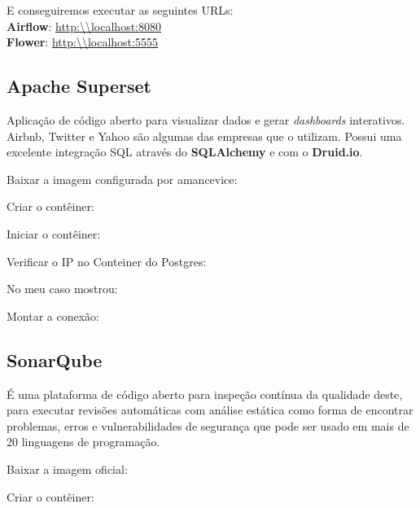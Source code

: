 \documentclass[a4paper,11pt]{article}
\begin{document}
E conseguiremos executar as seguintes URLs: \\
\textbf{Airflow}: \url{http:\\localhost:8080} \\
\textbf{Flower}: \url{http:\\localhost:5555}

\subsection{Apache Superset}
Aplicação de código aberto para visualizar dados e gerar \textit{dashboards} interativos. Airbnb, Twitter e Yahoo são algumas das empresas que o utilizam. Possui uma excelente integração SQL através do \textbf{SQLAlchemy} e com o \textbf{Druid.io}.

Baixar a imagem configurada por amancevice: \\

Criar o contêiner: \\

Iniciar o contêiner: \\

Verificar o IP no Conteiner do Postgres: \\

No meu caso mostrou: \\

Montar a conexão: \\

\subsection{SonarQube}
É uma plataforma de código aberto para inspeção contínua da qualidade deste, para executar revisões automáticas com análise estática como forma de encontrar problemas, erros e vulnerabilidades de segurança que pode ser usado em mais de 20 linguagens de programação.

Baixar a imagem oficial: \\

Criar o contêiner: \\
\end{document}
